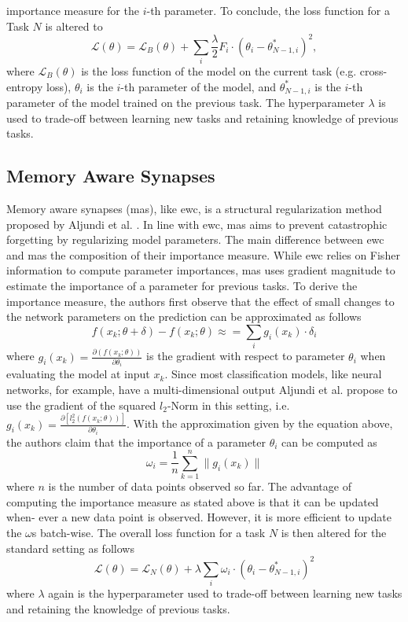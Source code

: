 importance measure for the $i$-th parameter. To conclude, the loss function for a Task $N$ is altered to
\begin{equation}
    \mathcal{L}(\theta) = \mathcal{L}_B(\theta) + \sum_i \frac{\lambda}{2} F_i \cdot (\theta_i - \theta^*_{N-1,i})^2,
\end{equation}
where $\mathcal{L}_B(\theta)$ is the loss function of the model on the current task (e.g. cross-entropy loss), $\theta_i$ is the $i$-th parameter of the model,
and $\theta^*_{N-1,i}$ is the $i$-th parameter of the model trained on the previous task. The hyperparameter $\lambda$ is used to trade-off between
learning new tasks and retaining knowledge of previous tasks.

\subsection{Memory Aware Synapses}
\label{sec:Related_work:Continual_Learning:MAS}
Memory aware synapses (\gls{mas}), like \gls{ewc}, is a structural regularization method proposed by Aljundi et al. \cite{aljundi2018memory}. 
In line with \gls{ewc}, \gls{mas} aims to prevent catastrophic forgetting by regularizing model parameters. The main difference between \gls{ewc} and
\gls{mas} the composition of their importance measure. While \gls{ewc} relies on Fisher information to compute parameter importances, \gls{mas} uses
gradient magnitude to estimate the importance of a parameter for previous tasks. To derive the importance measure, the authors first observe that the
effect of small changes to the network parameters on the prediction can be approximated as follows
\begin{equation}
    f(x_k; \theta + \delta) - f(x_k; \theta) \approx = \sum_i g_i(x_k) \cdot \delta_i
\end{equation}
where $g_i(x_k) = \frac{\partial(f(x_k;\theta))}{\partial \theta_i}$  is the gradient with respect to parameter $\theta_i$ when evaluating the model at
input $x_k$. Since most classification models, like neural networks, for example, have a multi-dimensional output Aljundi et al. propose to use the gradient
of the squared $l_2$-Norm in this setting, i.e. $g_i(x_k) =  \frac{\partial[l^2_2(f(x_k;\theta))]}{\partial \theta_i}$. With the approximation given by the
equation above, the authors claim that the importance of a parameter $\theta_i$ can be computed as
\begin{equation}
    \omega_i = \frac{1}{n} \sum_{k=1}^n \lVert g_i(x_k) \rVert
\end{equation}
where $n$ is the number of data points observed so far. The advantage of computing the importance measure as stated above is that it can be updated when-
ever a new data point is observed. However, it is more efficient to update the $\omega$s batch-wise. The overall loss function for a task $N$ is
then altered for the standard setting as follows
\begin{equation}
    \mathcal{L}(\theta) = \mathcal{L}_N(\theta) + \lambda \sum_i \omega_i \cdot (\theta_i - \theta^*_{N-1,i})^2
\end{equation}
where $\lambda$ again is the hyperparameter used to trade-off between learning new tasks and retaining the knowledge of previous tasks.

